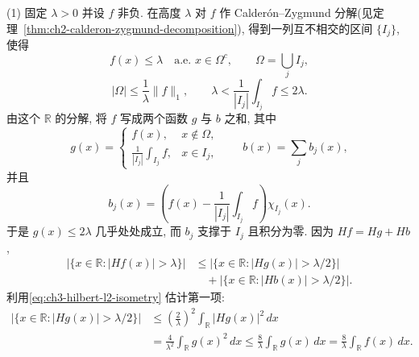 \hypertarget{chapter-03-page-064}{}
\begin{Proof}
(1) 固定 $\lambda>0$ 并设 $f$ 非负. 在高度 $\lambda$ 对 $f$ 作 Calderón--Zygmund 分解(见定理~\ref{thm:ch2-calderon-zygmund-decomposition}), 得到一列互不相交的区间 $\{I_j\}$, 使得
\[
 f(x)\le\lambda\quad\text{a.e. }x\in\Omega^c,
 \qquad \Omega=\bigcup_j I_j,
\]
\[
 |\Omega|\le\frac1\lambda\|f\|_1,
 \qquad
 \lambda<\frac1{|I_j|}\int_{I_j}f\le2\lambda.
\]
由这个 $\mathbb R$ 的分解, 将 $f$ 写成两个函数 $g$ 与 $b$ 之和, 其中
\[
 g(x)=
 \begin{cases}
  f(x),&x\notin\Omega,\\
  \displaystyle\frac1{|I_j|}\int_{I_j}f,&x\in I_j,
 \end{cases}
 \qquad
 b(x)=\sum_j b_j(x),
\]
并且
\[
 b_j(x)=\left(f(x)-\frac1{|I_j|}\int_{I_j}f\right)\chi_{I_j}(x).
\]
于是 $g(x)\le2\lambda$ 几乎处处成立, 而 $b_j$ 支撑于 $I_j$ 且积分为零. 因为 $Hf=Hg+Hb$,
\[
\begin{aligned}
 \bigl|\{x\in\mathbb R:|Hf(x)|>\lambda\}\bigr|
 &\le \bigl|\{x\in\mathbb R:|Hg(x)|>\lambda/2\}\bigr|\\
 &\quad+\bigl|\{x\in\mathbb R:|Hb(x)|>\lambda/2\}\bigr|.
\end{aligned}
\]
利用\eqref{eq:ch3-hilbert-l2-isometry} 估计第一项:
\[
\begin{aligned}
 \bigl|\{x\in\mathbb R:|Hg(x)|>\lambda/2\}\bigr|
 &\le\left(\frac2\lambda\right)^2\int_{\mathbb R}|Hg(x)|^2\,dx\\
 &=\frac4{\lambda^2}\int_{\mathbb R}g(x)^2\,dx
 \le\frac8\lambda\int_{\mathbb R}g(x)\,dx
 =\frac8\lambda\int_{\mathbb R}f(x)\,dx.
\end{aligned}
\]


\end{Proof}
